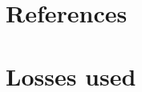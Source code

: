 \documentclass{article}
\begin{document}
\section*{References}




\newpage
\appendix


\section{Losses used}
\label{appendix-losses}
\end{document}

